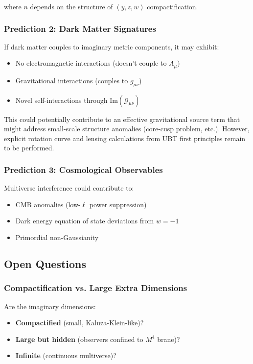 where $n$ depends on the structure of $(y, z, w)$ compactification.

\subsubsection{Prediction 2: Dark Matter Signatures}

If dark matter couples to imaginary metric components, it may exhibit:
\begin{itemize}
\item No electromagnetic interactions (doesn't couple to $A_{\mu}$)
\item Gravitational interactions (couples to $g_{\mu\nu}$)
\item Novel self-interactions through $\text{Im}(\mathcal{G}_{\mu\nu})$
\end{itemize}

This could potentially contribute to an effective gravitational source term that might address small-scale structure anomalies (core-cusp problem, etc.).
However, explicit rotation curve and lensing calculations from UBT first principles remain to be performed.

\subsubsection{Prediction 3: Cosmological Observables}

Multiverse interference could contribute to:
\begin{itemize}
\item CMB anomalies (low-$\ell$ power suppression)
\item Dark energy equation of state deviations from $w = -1$
\item Primordial non-Gaussianity
\end{itemize}

\subsection{Open Questions}

\subsubsection{Compactification vs. Large Extra Dimensions}

Are the imaginary dimensions:
\begin{itemize}
\item \textbf{Compactified} (small, Kaluza-Klein-like)?
\item \textbf{Large but hidden} (observers confined to $M^4$ brane)?
\item \textbf{Infinite} (continuous multiverse)?
\end{itemize}

